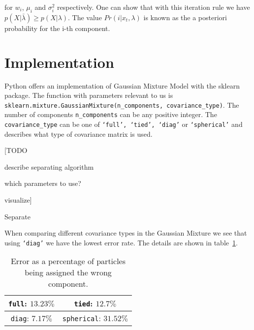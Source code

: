 for $w_i$, $\mu_i$ and $\sigma_i^2$ respectively. One can show that with this iteration rule we have $p(X|\bar{\lambda}) \geq p(X|\lambda)$. The value $Pr(i|x_t, \lambda)$ is known as the a posteriori probability for the i-th component.



\section{Implementation}

Python offers an implementation of Gaussian Mixture Model with the sklearn package. The function with parameters relevant to us is \texttt{sklearn.mixture.GaussianMixture(n\_components, covariance\_type)}. The number of components \texttt{n\_components} can be any positive integer. The \texttt{covariance\_type} can be one of \texttt{‘full’, ‘tied’, ‘diag’} or \texttt{‘spherical’} and describes what type of covariance matrix is used.

[TODO

describe separating algorithm

which parameters to use?

visualize]

\begin{algorithm}[H] \label{alg:separate}
	\SetAlgoLined
	\DontPrintSemicolon
	\LinesNumbered
	\caption{Separate}
	
	
	\BlankLine
\end{algorithm}
\vspace{1cm}

When comparing different covariance types in the Gaussian Mixture we see that using \texttt{‘diag’} we have the lowest error rate. The details are shown in table~\ref{tab:covariance_type_comparison}.

\begin{table}[h!]
	\centering
	\begin{tabular}{|c|c|}
		\hline
		\texttt{full}: $13.23\%$ & \texttt{tied}: $12.7\%$ \\
		\hline
		\texttt{diag}: $7.17\%$ & \texttt{spherical}: $31.52\%$ \\
		\hline
	\end{tabular}
	\label{tab:covariance_type_comparison}
	\caption{Error as a percentage of particles being assigned the wrong component.}
\end{table}

